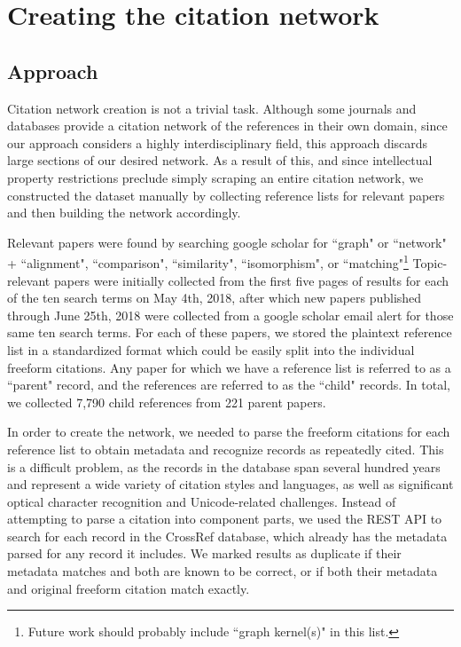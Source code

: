 \documentclass[12pt]{thesis}
\theoremstyle{plain}
\theoremstyle{definition}
\theoremstyle{remark}
\begin{document}
\chapter{Creating the citation network}\label{chapter:dataset_creation_and_analysis}

\section{Approach}

Citation network creation is not a trivial task. Although some journals and databases provide a citation network of the references in their own domain, since our approach considers a highly interdisciplinary field, this approach discards large sections of our desired network. As a result of this, and since intellectual property restrictions preclude simply scraping an entire citation network, we constructed the dataset manually by collecting reference lists for relevant papers and then building the network accordingly.

Relevant papers were found by searching google scholar for ``graph" or ``network" +  ``alignment", ``comparison", ``similarity", ``isomorphism", or ``matching"\footnote{Future work should probably include ``graph kernel(s)" in this list.} Topic-relevant papers were initially collected from the first five pages of results for each of the ten search terms on May 4th, 2018, after which new papers published through June 25th, 2018 were collected from a google scholar email alert for those same ten search terms. For each of these papers, we stored the plaintext reference list in a standardized format which could be easily split into the individual freeform citations. Any paper for which we have a reference list is referred to as a ``parent" record, and the references are referred to as the ``child" records. In total, we collected 7,790 child references from 221 parent papers.

In order to create the network, we needed to parse the freeform citations for each reference list to obtain metadata and recognize records as repeatedly cited. This is a difficult problem, as the records in the database span several hundred years and represent a wide variety of citation styles and languages, as well as significant optical character recognition and Unicode-related challenges. Instead of attempting to parse a citation into component parts, we used the REST API to search for each record in the CrossRef database, which already has the metadata parsed for any record it includes. We marked results as duplicate if their metadata matches and both are known to be correct, or if both their metadata and original freeform citation match exactly. 
\end{document}
